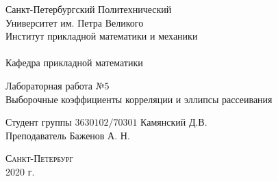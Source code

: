 \documentclass[a4]{article}
\begin{document}



\def\contentsname{\LARGE{Содержание}}
\thispagestyle{empty}
\begin{center} 
\vspace{2cm} 
{\Large \sc Санкт-Петербургский Политехнический}\\
\vspace{2mm}
{\Large \sc Университет} им. {\Large\sc Петра Великого}\\
\vspace{1cm}
{\large \sc Институт прикладной математики и механики\\ 
\vspace{0.5mm}
\textsc{}}\\ 
\vspace{0.5mm}
{\large\sc Кафедра прикладной математики}\\
\vspace{15mm}
{\huge \sc Лабораторная работа №$5$\\
	Выборочные коэффициенты корреляции и эллипсы рассеивания
	\vspace{6mm}
	
}
\vspace*{2mm}
\vspace{6cm} 
Студент группы $3630102/70301$ \hfill Камянский Д.В.\\
\vspace{1cm}
Преподаватель \hfill Баженов А. Н.\\
\vspace{20mm} 


\vfill {\large\textsc{Санкт-Петербург}}\\ 
2020 г.
\end{center}


\newpage
\pagestyle{plain}
\end{document}
